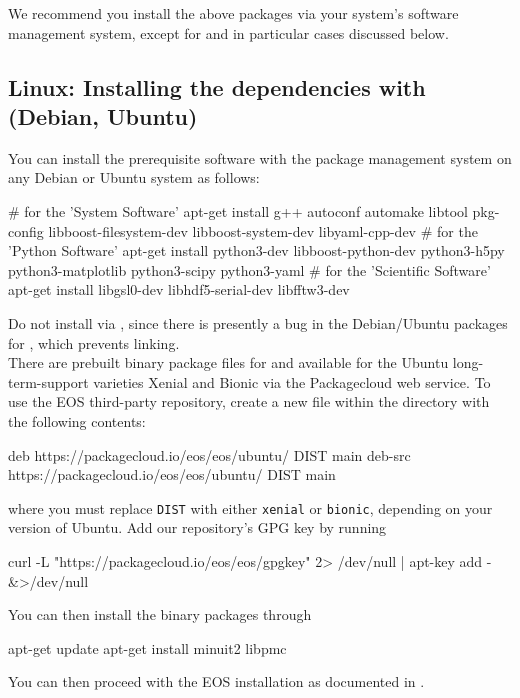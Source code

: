 We recommend you install the above packages via your system's software
management system, except for  and  in particular
cases discussed below.

\subsection{Linux: Installing the dependencies with  (Debian, Ubuntu)}

You can install the prerequisite software with the  package
management system on any Debian or Ubuntu system as follows:
\begin{commandline}
# for the 'System Software'
apt-get install g++ autoconf automake libtool pkg-config libboost-filesystem-dev libboost-system-dev libyaml-cpp-dev
# for the 'Python Software'
apt-get install python3-dev libboost-python-dev python3-h5py python3-matplotlib python3-scipy python3-yaml
# for the 'Scientific Software'
apt-get install libgsl0-dev libhdf5-serial-dev libfftw3-dev
\end{commandline}
Do not install  via , since there is presently a
bug in the Debian/Ubuntu packages for , which prevents
linking.\\


There are prebuilt binary package files for
 and  available for the Ubuntu
long-term-support varieties Xenial and Bionic via the Packagecloud web service.
To use the EOS third-party repository, create a new file  within
the directory  with the following contents:
\begin{file}
deb https://packagecloud.io/eos/eos/ubuntu/ DIST main
deb-src https://packagecloud.io/eos/eos/ubuntu/ DIST main
\end{file}
where you must replace \texttt{DIST} with either \texttt{xenial} or
\texttt{bionic}, depending on your version of Ubuntu. Add our repository's
GPG key by running
\begin{commandline}
curl -L "https://packagecloud.io/eos/eos/gpgkey" 2> /dev/null | apt-key add - &>/dev/null
\end{commandline}
You can then install the binary packages through
\begin{commandline}
apt-get update
apt-get install minuit2 libpmc
\end{commandline}

You can then proceed with the EOS installation as documented in .

